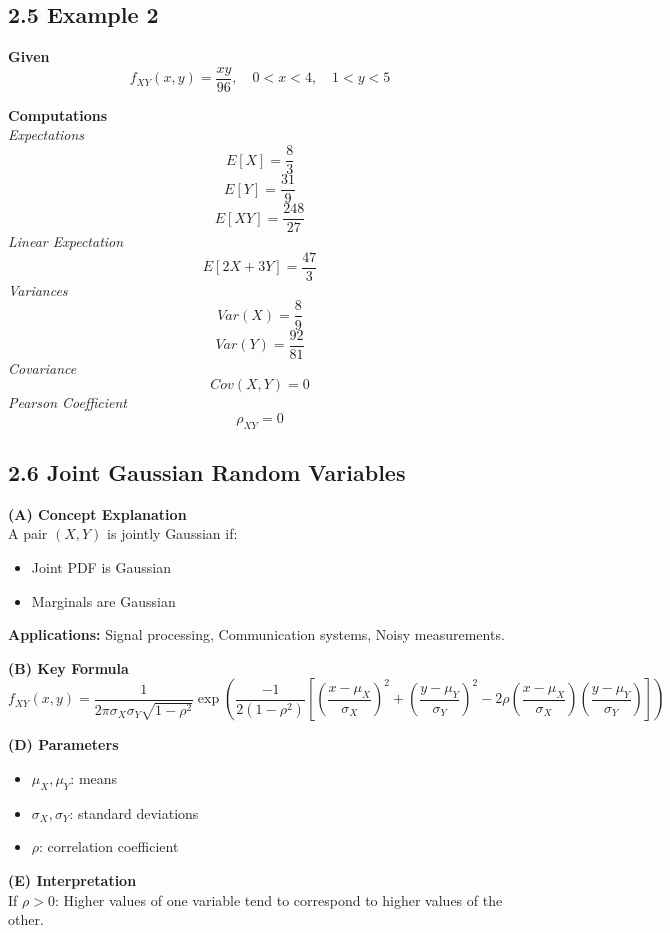 \documentclass[12pt]{article}
\begin{document}
\subsection*{2.5 Example 2}

\textbf{Given}
\[ \boxed{f_{XY}(x,y)=\frac{xy}{96}, \quad 0<x<4, \quad 1<y<5} \]

\textbf{Computations} \\
\textit{Expectations}
\[ \boxed{E[X]=\frac{8}{3}} \]
\[ \boxed{E[Y]=\frac{31}{9}} \]
\[ \boxed{E[XY]=\frac{248}{27}} \]
\textit{Linear Expectation}
\[ \boxed{E[2X+3Y]=\frac{47}{3}} \]
\textit{Variances}
\[ \boxed{Var(X)=\frac{8}{9}} \]
\[ \boxed{Var(Y)=\frac{92}{81}} \]
\textit{Covariance}
\[ \boxed{Cov(X,Y)=0} \]
\textit{Pearson Coefficient}
\[ \boxed{\rho_{XY}=0} \]

\hrulefill

\subsection*{2.6 Joint Gaussian Random Variables}

\textbf{(A) Concept Explanation} \\
A pair $(X, Y)$ is jointly Gaussian if:
\begin{itemize}[noitemsep]
    \item Joint PDF is Gaussian
    \item Marginals are Gaussian
\end{itemize}
\textbf{Applications:} Signal processing, Communication systems, Noisy measurements.

\textbf{(B) Key Formula}
\[ \boxed{f_{XY}(x,y)=\frac{1}{2\pi\sigma_{X}\sigma_{Y}\sqrt{1-\rho^{2}}}\exp\left(\frac{-1}{2(1-\rho^{2})}\left[\left(\frac{x-\mu_{X}}{\sigma_{X}}\right)^{2}+\left(\frac{y-\mu_{Y}}{\sigma_{Y}}\right)^{2}-2\rho\left(\frac{x-\mu_{X}}{\sigma_{X}}\right)\left(\frac{y-\mu_{Y}}{\sigma_{Y}}\right)\right]\right)} \]

\textbf{(D) Parameters}
\begin{itemize}[noitemsep]
    \item $\mu_{X}, \mu_{Y}$: means
    \item $\sigma_{X}, \sigma_{Y}$: standard deviations
    \item $\rho$: correlation coefficient
\end{itemize}

\textbf{(E) Interpretation} \\
If $\rho>0$: Higher values of one variable tend to correspond to higher values of the other.
\end{document}
